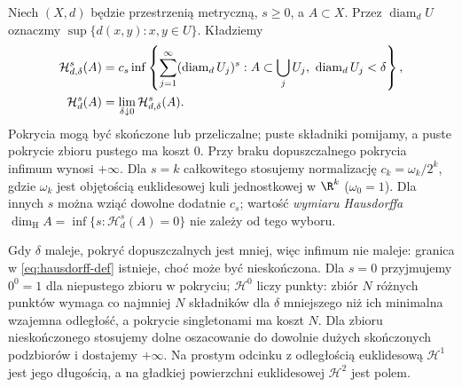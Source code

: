 \begin{definicja}
\label{def:miara-hausdorffa}
Niech $(X,d)$ będzie przestrzenią metryczną,
$s\geq0$, a $A\subset X$.
Przez $\operatorname{diam}_d U$ oznaczmy
$\sup\{d(x,y):x,y\in U\}$. Kładziemy
\begin{align}\label{eq:hausdorff-def}
 \mathcal H^s_{d,\delta}(A)
 &=c_s\inf\left\{
       \sum_{j=1}^{\infty}(\operatorname{diam}_d U_j)^s:
       A\subset\bigcup_j U_j,\
       \operatorname{diam}_d U_j<\delta\right\},\\
 \mathcal H^s_d(A)
 &=\lim_{\delta\downarrow0}
                  \mathcal H^s_{d,\delta}(A).
 \notag
\end{align}
Pokrycia mogą być skończone lub przeliczalne;
puste składniki pomijamy, a puste pokrycie zbioru
pustego ma koszt $0$. Przy braku dopuszczalnego
pokrycia infimum wynosi $+\infty$.
Dla $s=k$ całkowitego stosujemy normalizację
$c_k=\omega_k/2^k$, gdzie $\omega_k$
jest objętością euklidesowej kuli jednostkowej
w $\R^k$ ($\omega_0=1$). Dla innych $s$
można wziąć dowolne dodatnie $c_s$;
wartość \emph{wymiaru Hausdorffa}
$\dim_{\mathrm H}A
=\inf\{s:\mathcal H^s_d(A)=0\}$
nie zależy od tego wyboru.
\end{definicja}

Gdy $\delta$ maleje, pokryć dopuszczalnych
jest mniej, więc infimum nie maleje:
granica w \eqref{eq:hausdorff-def} istnieje,
choć może być nieskończona.
Dla $s=0$ przyjmujemy $0^0=1$ dla
niepustego zbioru w pokryciu;
$\mathcal H^0$ liczy punkty: zbiór $N$ różnych punktów
wymaga co najmniej $N$ składników dla $\delta$ mniejszego
niż ich minimalna wzajemna odległość, a pokrycie
singletonami ma koszt $N$. Dla zbioru nieskończonego
stosujemy dolne oszacowanie do dowolnie dużych
skończonych podzbiorów i dostajemy $+\infty$.
Na prostym odcinku z odległością euklidesową $\mathcal H^1$ jest
jego długością, a na gładkiej powierzchni euklidesowej
$\mathcal H^2$ jest polem.

